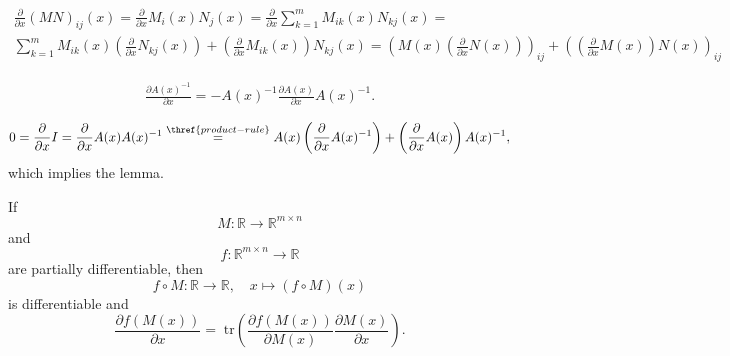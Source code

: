 \documentclass[a4paper,11pt]{report}
\newcommand{\tr}{\;\text{tr}}
\begin{document}
\begin{appendices}
\begin{Bew}
\begin{align*}
\frac{\partial}{\partial x}(MN)_{ij}(x)=
\frac{\partial}{\partial x}M_i(x)N_j(x)=
\frac{\partial}{\partial x}\sum_{k=1}^mM_{ik}(x)N_{kj}(x)=\\
\sum_{k=1}^m
M_{ik}(x)\left(\frac{\partial}{\partial x}N_{kj}(x)\right)+
\left(\frac{\partial}{\partial x}M_{ik}(x)\right)N_{kj}(x)=
\left(M(x)\left(\frac{\partial}{\partial x}N(x)\right)\right)_{ij}+
\left(\left(\frac{\partial}{\partial x}M(x)\right)N(x)\right)_{ij}
\end{align*}
\end{Bew}

\begin{Lem}\label{inverse-chain}
\begin{align*}
\frac{\partial A(x)^{-1}}{\partial x}=-A(x)^{-1}\frac{\partial A(x)}{\partial x}A(x)^{-1}.
\end{align*}
\end{Lem}

\begin{Bew}
\begin{align*}
0=\frac{\partial}{\partial x}I=
\frac{\partial}{\partial x}A(x)A(x)^{-1}\overset{\thref{product-rule}}{=}
A(x)\left(\frac{\partial}{\partial x}A(x)^{-1}\right)+
\left(\frac{\partial}{\partial x}A(x)\right)A(x)^{-1},
\end{align*}
which implies the lemma.
\end{Bew}

\begin{Lem}\label{chain-rule}
If
\[
M:\mathbb{R}\to\mathbb{R}^{m\times n}
\]
and
\[
f:\mathbb{R}^{m\times n}\to\mathbb{R}
\]
are partially differentiable, then
\[
f\circ M:\mathbb{R}\to\mathbb{R},
\quad
x\mapsto (f\circ M)(x)
\]
is differentiable and
\[
\frac{\partial f\left(M(x)\right)}{\partial x}=
\tr\left(\frac{\partial f\left(M(x)\right)}{\partial M(x)}\frac{\partial M(x)}{\partial x}\right).
\]
\end{Lem}


\end{appendices}
\end{document}
